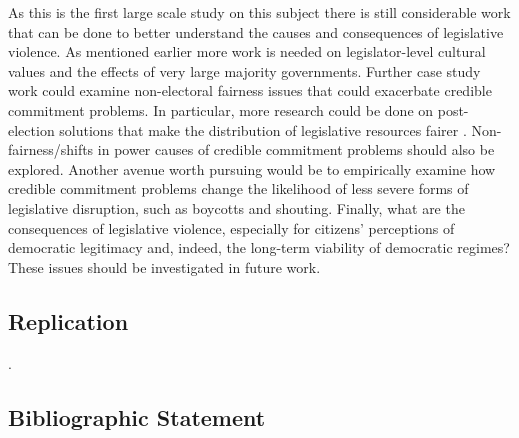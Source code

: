 \documentclass[a4paper]{article}\usepackage[]{graphicx}\usepackage[]{color}
\begin{document}
As this is the first large scale study on this subject there is still considerable work that can be done to better understand the causes and consequences of legislative violence. As mentioned earlier more work is needed on legislator-level cultural values and the effects of very large majority governments. Further case study work could examine non-electoral fairness issues that could exacerbate credible commitment problems. In particular, more research could be done on post-election solutions that make the distribution of legislative resources fairer \cite[for example see][who examined informal minority party access to power in Japan's Diet]{Wolfe2004}. Non-fairness/shifts in power causes of credible commitment problems should also be explored. Another avenue worth pursuing would be to empirically examine how credible commitment problems change the likelihood of less severe forms of legislative disruption, such as boycotts and shouting. Finally, what are the consequences of legislative violence, especially for citizens' perceptions of democratic legitimacy and, indeed, the long-term viability of democratic regimes? These issues should be investigated in future work.

\subsection*{Replication}

 \citep{R-cite}.






\subsection*{Bibliographic Statement}

\end{document}
